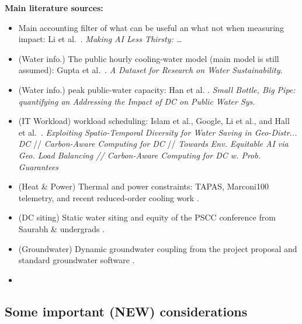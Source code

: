 \documentclass[10pt]{article}
\begin{document}
\textbf{Main literature sources:}
\begin{itemize}
    \item Main accounting filter of what can be useful an what not when measuring impact: Li et al.\ \cite{li2023thirsty}. \emph{Making AI Less Thirsty: \ldots}
    \item (Water info.) The public hourly cooling-water model (main model is still assumed): Gupta et al.\ \cite{gupta2024dataset}. \emph{A Dataset for Research on Water Sustainability}.
    \item (Water info.) peak public-water capacity: Han et al. \cite{han2026pipe}. \emph{Small Bottle, Big Pipe: quantifying an Addressing the Impact of DC on Public Water Sys.}
    \item (IT Workload) workload scheduling: Islam et al., Google, Li et al., and Hall et al.\ \cite{islam2018wace,radovanovic2021carbon,li2024equitable,hall2024probabilistic}. \emph{Exploiting Spatio-Temporal Diversity for Water Saving in Geo-Distr... DC} // \emph{Carbon-Aware Computing for DC} // \emph{Towards Env. Equitable AI via Geo. Load Balancing // Carbon-Aware Computing for DC w. Prob. Guarantees} 
    \item (Heat \& Power) Thermal and power constraints: TAPAS, Marconi100 telemetry, and recent reduced-order cooling work \cite{stojkovic2025tapas,borghesi2023m100,ngwerume2026thermal}. 
    \item (DC siting) Static water siting and equity of the PSCC conference from Saurabh \& undergrads \cite{chen2026pscc}.
    \item (Groundwater) Dynamic groundwater coupling from the project proposal and standard groundwater software \cite{amin2026jwafs,modflow670}.
    \item 
\end{itemize}

  
\subsection{Some important (NEW) considerations}
\end{document}
